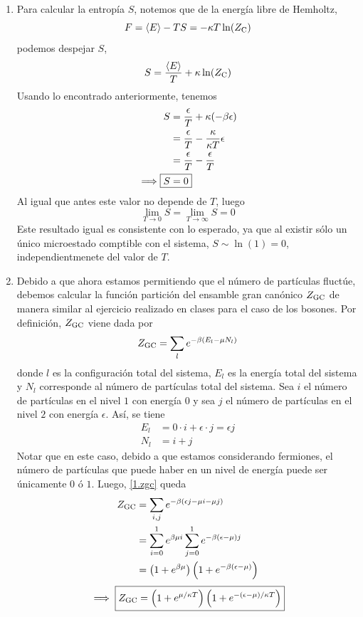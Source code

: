 \begin{sol}
\begin{enumerate}
\item 
Para calcular la entropía $S$, notemos que de la energía libre de Hemholtz,
\begin{equation}
  F=\ev{E}-TS=-\k T\ln (\zc)
\end{equation}
podemos despejar $S$,
\begin{equation}
  S=\frac{\ev{E}}{T}+\k \ln(\zc )
\end{equation}
Usando lo encontrado anteriormente, tenemos
\begin{align}
  S&=\frac{\epsilon}{T}+\k (-\b \epsilon)\\
  &=\frac{\epsilon}{T}-\frac{\kappa}{\k T}\epsilon\\
  &=\frac{\epsilon}{T}-\frac{\epsilon}{T}\\
  \implies \Aboxed{S&=0}
\end{align}
Al igual que antes este valor no depende de $T$, luego
\begin{equation}
  \boxed{\lim_{T\to 0}S= \lim_{T\to\infty}S=0}
\end{equation}
Este resultado igual es consistente con lo esperado, ya que al existir sólo un único microestado comptible con  el sistema, $S\sim \ln (1)=0$, independientmenete del valor de $T$.
 \item
Debido a que ahora estamos permitiendo que el número de partículas fluctúe, debemos calcular la función partición del ensamble gran canónico $Z_{\rm GC}$ de manera similar al ejercicio realizado en clases para el caso de los bosones. Por definición, $Z_{\rm GC}$ viene dada por
\begin{equation}\label{1.zgc}
  Z_{\rm GC}=\sum_le^{-\beta (E_l-\mu N_l)}
\end{equation}
donde $l$ es la configuración total del sistema, $E_l$ es la energía total del sistema y $N_l$ corresponde al número de partículas total del sistema. Sea $i$ el número de partículas en el nivel $1$ con energía $0$ y sea $j$ el número de partículas en el nivel $2$ con energía $\epsilon$. Así, se tiene
\begin{align}
  E_l&=0\cdot i+\epsilon\cdot j=\epsilon j\\
  N_l&=i+j
\end{align}
Notar que en este caso, debido a que estamos considerando fermiones, el número de partículas que puede haber en un nivel de energía puede ser únicamente $0$ ó $1$. Luego, \eqref{1.zgc} queda
\begin{align}
  Z_{\rm GC} &=\sum_{i,j}e^{-\beta(\epsilon j-\mu i-\mu j)}\\
  &=\sum_{i=0}^1e^{\beta \mu i}\sum_{j=0}^1e^{-\beta (\epsilon-\mu )j}\\
  &=\left(1+e^{\beta \mu }\right)\left(1+e^{-\beta(\epsilon-\mu )}\right)\label{1.zgc-exp}
\end{align}
\begin{equation}
	\implies\boxed{ Z_{\rm GC}=\left(1+e^{\mu/\kappa T }\right)\left(1+e^{-(\epsilon-\mu )/\kappa T}\right)}
\end{equation}


\end{enumerate}
\end{sol}
